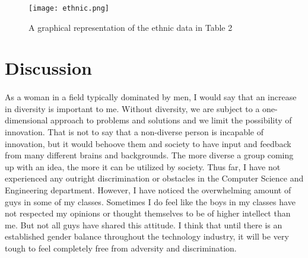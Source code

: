 \documentclass[letterpaper]{article}
\begin{document}
\begin{figure}[h]
   \texttt{[image: ethnic.png]}
   \centering
   \caption{A graphical representation of the ethnic data in Table 2}
\end{figure}

\break

\section*{Discussion}

\paragraph{}

As a woman in a field typically dominated by men, I would say that an increase in diversity is important to me. Without diversity, we are subject to a one-dimensional approach to problems and solutions and we limit the possibility of innovation. That is not to say that a non-diverse person is incapable of innovation, but it would behoove them and society to have input and feedback from many different brains and backgrounds. The more diverse a group coming up with an idea, the more it can be utilized by society. Thus far, I have not experienced any outright discrimination or obstacles in the Computer Science and Engineering department. However, I have noticed the overwhelming amount of guys in some of my classes. Sometimes I do feel like the boys in my classes have not respected my opinions or thought themselves to be of higher intellect than me. But not all guys have shared this attitude. I think that until there is an established gender balance throughout the technology industry, it will be very tough to feel completely free from adversity and discrimination. 
\end{document}
